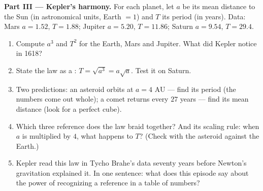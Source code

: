 \begin{problem}
\medskip
\noindent\textbf{Part III --- Kepler's harmony.}
For each planet, let $a$ be its mean distance to the Sun (in
astronomical units, Earth $= 1$) and $T$ its period (in years).
Data: Mars $a = 1.52$, $T = 1.88$; Jupiter $a = 5.20$,
$T = 11.86$; Saturn $a = 9.54$, $T = 29.4$.
\begin{enumerate}[resume]
  \item Compute $a^3$ and $T^2$ for the Earth, Mars and Jupiter.
        What did Kepler notice in 1618?
  \item State the law as a : $T = \sqrt{a^3} = a\sqrt a$.
        Test it on Saturn.
  \item Two predictions: an asteroid orbits at $a = 4$ AU ---
        find its period (the numbers come out whole); a comet
        returns every $27$ years --- find its mean distance
        (look for a perfect cube).
  \item Which three reference  does the law braid
        together? And its scaling rule: when $a$ is multiplied
        by $4$, what happens to $T$? (Check with the asteroid
        against the Earth.)
  \item Kepler read this law in Tycho Brahe's data seventy years
        before Newton's gravitation explained it. In one
        sentence: what does this episode say about the power of
        recognizing a reference  in a table of numbers?
\end{enumerate}


\end{problem}
